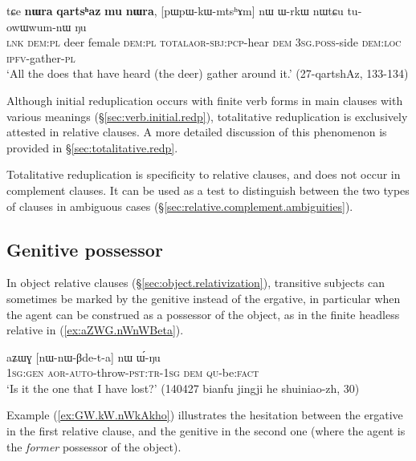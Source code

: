 \begin{exe}
\ex \label{ex:qartshaz.pWpWkWmtshAm}
\gll  tɕe \textbf{nɯra} \textbf{qartsʰaz} \textbf{mu} \textbf{nɯra},  [pɯ\redp{}pɯ-kɯ-mtsʰɤm] nɯ ɯ-rkɯ nɯtɕu tu-owɯwum-nɯ ŋu \\
\textsc{lnk} \textsc{dem}:\textsc{pl} deer female \textsc{dem}:\textsc{pl} \textsc{total}\redp{}\textsc{aor}-\textsc{sbj}:\textsc{pcp}-hear \textsc{dem} \textsc{3sg}.\textsc{poss}-side \textsc{dem}:\textsc{loc} \textsc{ipfv}-gather-\textsc{pl} \\
\glt `All the does that have heard (the deer) gather around it.' (27-qartshAz, 133-134)
\end{exe}


Although initial reduplication occurs with finite verb forms in main clauses with various meanings (§\ref{sec:verb.initial.redp}), totalitative reduplication is exclusively attested in relative clauses. A more detailed discussion of this phenomenon is provided in §\ref{sec:totalitative.redp}.

Totalitative reduplication is specificity to relative clauses, and does not occur in complement clauses. It can be used as a test to distinguish between the two types of clauses in ambiguous cases (§\ref{sec:relative.complement.ambiguities}).

 \subsection{Genitive possessor } \label{sec:relative.genitive.possessor.subject}
In object relative clauses (§\ref{sec:object.relativization}), transitive subjects can sometimes be marked by the genitive instead of the ergative, in particular when the agent can be construed as a possessor of the object, as in the finite headless relative in (\ref{ex:aZWG.nWnWBeta}).  

 \begin{exe}
\ex \label{ex:aZWG.nWnWBeta}
 \gll aʑɯɣ [nɯ-nɯ-βde-t-a] nɯ ɯ́-ŋu \\
 \textsc{1sg}:\textsc{gen} \textsc{aor}-\textsc{auto}-throw-\textsc{pst}:\textsc{tr}-\textsc{1sg} \textsc{dem} \textsc{qu}-be:\textsc{fact} \\
 \glt `Is it the one that I have lost?' (140427 bianfu jingji he shuiniao-zh, 30)
\end{exe}

Example (\ref{ex:GW.kW.nWkAkho}) illustrates the hesitation between the ergative in the first relative clause, and the genitive in the second one (where the agent is the \textit{former} possessor of the object).

